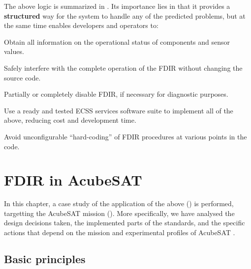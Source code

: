 \documentclass[a4paper,nobib]{tufte-book}
\begin{document}
The above logic is summarized in . Its importance lies in that it provides a \textbf{structured} way for the system to handle any of the predicted problems, but at the same time enables developers and operators to:
\begin{compactitem}
	\item Obtain all information on the operational status of components and sensor values.
	\item Safely interfere with the complete operation of the \acs{FDIR} without changing the source code.
	\item Partially or completely disable \acs{FDIR}, if necessary for diagnostic purposes.
	\item Use a ready and tested \acs{ECSS} services software suite to implement all of the above, reducing cost and development time.
	\item Avoid unconfigurable ``hard-coding'' of \acs{FDIR} procedures at various points in the code.
\end{compactitem}

\chapter{\acs{FDIR} in AcubeSAT}
\label{cap:acufdir}

In this chapter, a case study of the application of the above () is performed, targetting the AcubeSAT mission (). More specifically, we have analysed the design decisions taken, the implemented parts of the standards, and the specific actions that depend on the mission and experimental profiles of AcubeSAT \autocite{FMEA}.


\section{Basic principles}
\label{sec:fdirbaspri}
\end{document}
